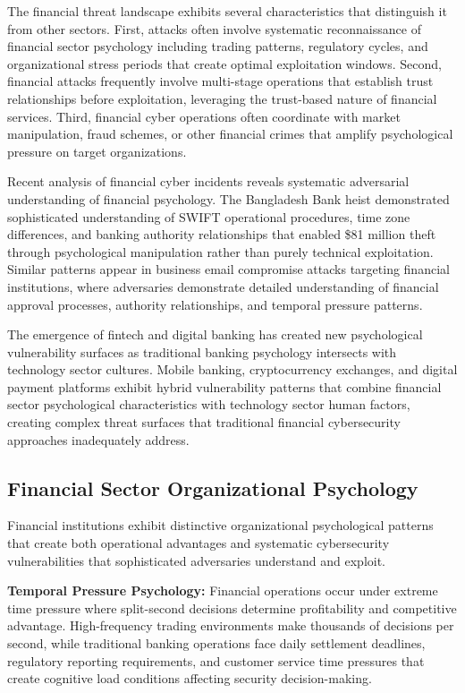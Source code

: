 \documentclass[10pt, twocolumn]{article}
\begin{document}
The financial threat landscape exhibits several characteristics that distinguish it from other sectors. First, attacks often involve systematic reconnaissance of financial sector psychology including trading patterns, regulatory cycles, and organizational stress periods that create optimal exploitation windows. Second, financial attacks frequently involve multi-stage operations that establish trust relationships before exploitation, leveraging the trust-based nature of financial services. Third, financial cyber operations often coordinate with market manipulation, fraud schemes, or other financial crimes that amplify psychological pressure on target organizations.

Recent analysis of financial cyber incidents reveals systematic adversarial understanding of financial psychology. The Bangladesh Bank heist demonstrated sophisticated understanding of SWIFT operational procedures, time zone differences, and banking authority relationships that enabled \$81 million theft through psychological manipulation rather than purely technical exploitation\cite{swift2019}. Similar patterns appear in business email compromise attacks targeting financial institutions, where adversaries demonstrate detailed understanding of financial approval processes, authority relationships, and temporal pressure patterns.

The emergence of fintech and digital banking has created new psychological vulnerability surfaces as traditional banking psychology intersects with technology sector cultures. Mobile banking, cryptocurrency exchanges, and digital payment platforms exhibit hybrid vulnerability patterns that combine financial sector psychological characteristics with technology sector human factors, creating complex threat surfaces that traditional financial cybersecurity approaches inadequately address.

\subsection{Financial Sector Organizational Psychology}

Financial institutions exhibit distinctive organizational psychological patterns that create both operational advantages and systematic cybersecurity vulnerabilities that sophisticated adversaries understand and exploit.

\textbf{Temporal Pressure Psychology:} Financial operations occur under extreme time pressure where split-second decisions determine profitability and competitive advantage. High-frequency trading environments make thousands of decisions per second, while traditional banking operations face daily settlement deadlines, regulatory reporting requirements, and customer service time pressures that create cognitive load conditions affecting security decision-making.
\end{document}
